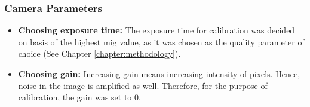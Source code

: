     \subsubsection*{Camera Parameters}\label{subsection:camera_parameters}
        \begin{itemize}
            
            \item \textbf{Choosing exposure time:} The exposure time for calibration was decided on basis of the highest \gls{mig} value, as it was chosen as the quality parameter of choice (See Chapter \ref{chapter:methodology}).
            
            \item \textbf{Choosing gain:} Increasing gain means increasing intensity of pixels. Hence, noise in the image is amplified as well. Therefore, for the purpose of calibration, the gain was set to 0.

        \end{itemize}


        

